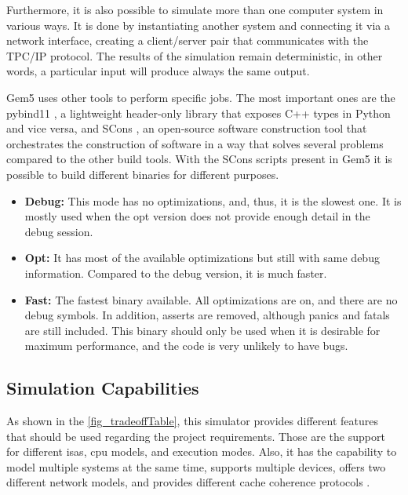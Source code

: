Furthermore, it is also possible to simulate more than one computer system in various ways. It is done by instantiating another system and 
connecting it via a network interface, creating a client/server pair that communicates with the TPC/IP protocol. The results of the simulation 
remain deterministic, in other words, a particular input will produce always the same output. 

Gem5 uses other tools to perform specific jobs. The most important ones are the pybind11 \cite{jakob2019pybind11}, a lightweight header-only 
library that exposes C++ types in Python and vice versa, and SCons \cite{knight2002scons}, an open-source software construction tool that 
orchestrates the construction of software in a way that solves several problems compared to the other build tools. With the SCons scripts 
present in Gem5 it is possible to build different binaries for different purposes. 

\begin{itemize}
    \item \textbf{Debug:} This mode has no optimizations, and, thus, it is the slowest one. It is mostly used when the opt version does not 
	provide enough detail in the debug session. 

    \item \textbf{Opt:} It has most of the available optimizations but still with same debug information. Compared to the debug version, it 
	is much faster.

    \item \textbf{Fast:} The fastest binary available. All optimizations are on, and there are no debug symbols. In addition, asserts are 
	removed, although panics and fatals are still included. This binary should only be used when it is desirable for maximum performance, and 
	the code is very unlikely to have bugs.
\end{itemize}

\subsection{Simulation Capabilities}
\label{subsec::SimCap}

As shown in the \autoref{fig_tradeoffTable}, this simulator provides different features that should be used regarding the project requirements. 
Those are the support for different \glspl{isa}, \gls{cpu} models, and execution modes. Also, it has the capability to model multiple systems 
at the same time, supports multiple devices, offers two different network models, and provides different cache coherence protocols \cite{TheGem5Simulator}.

